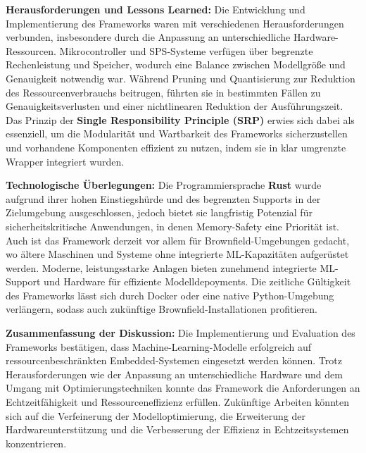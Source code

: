\textbf{Herausforderungen und Lessons Learned:} Die Entwicklung und Implementierung des Frameworks waren mit verschiedenen Herausforderungen verbunden, 
insbesondere durch die Anpassung an unterschiedliche Hardware-Ressourcen. Mikrocontroller und SPS-Systeme verfügen über begrenzte Rechenleistung und Speicher, 
wodurch eine Balance zwischen Modellgröße und Genauigkeit notwendig war. Während Pruning und Quantisierung zur Reduktion des Ressourcenverbrauchs beitrugen, 
führten sie in bestimmten Fällen zu Genauigkeitsverlusten und einer nichtlinearen Reduktion der Ausführungszeit. 
Das Prinzip der \textbf{Single Responsibility Principle (SRP)} erwies sich dabei als essenziell, um die Modularität und Wartbarkeit des 
Frameworks sicherzustellen und vorhandene Komponenten effizient zu nutzen, indem sie in klar umgrenzte Wrapper integriert wurden. 

\textbf{Technologische Überlegungen:} Die Programmiersprache \textbf{Rust} wurde aufgrund ihrer hohen Einstiegshürde und des begrenzten Supports 
in der Zielumgebung ausgeschlossen, jedoch bietet sie langfristig Potenzial für sicherheitskritische Anwendungen, in denen Memory-Safety eine Priorität ist. 
Auch ist das Framework derzeit vor allem für Brownfield-Umgebungen gedacht, wo ältere Maschinen und Systeme ohne integrierte ML-Kapazitäten aufgerüstet werden. 
Moderne, leistungsstarke Anlagen bieten zunehmend integrierte ML-Support und Hardware für effiziente Modelldepoyments. Die zeitliche Gültigkeit des Frameworks 
lässt sich durch Docker oder eine native Python-Umgebung verlängern, sodass auch zukünftige Brownfield-Installationen profitieren.

\textbf{Zusammenfassung der Diskussion:} Die Implementierung und Evaluation des Frameworks bestätigen, dass Machine-Learning-Modelle erfolgreich auf 
ressourcenbeschränkten Embedded-Systemen eingesetzt werden können. Trotz Herausforderungen wie der Anpassung an unterschiedliche Hardware und dem Umgang mit 
Optimierungstechniken konnte das Framework die Anforderungen an Echtzeitfähigkeit und Ressourceneffizienz erfüllen. Zukünftige Arbeiten könnten sich auf die 
Verfeinerung der Modelloptimierung, die Erweiterung der Hardwareunterstützung und die Verbesserung der Effizienz in Echtzeitsystemen konzentrieren.